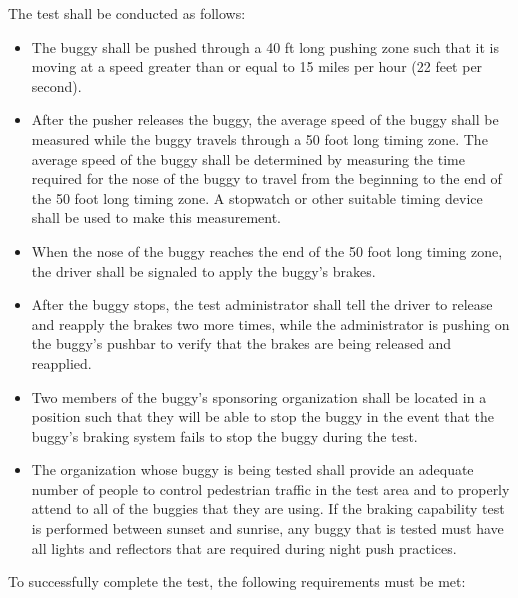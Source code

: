 	The test shall be conducted as follows:

	\begin{itemize}

		\item
		The buggy shall be pushed through a 40 ft long pushing zone such that it is moving at a speed greater than or equal to 15 miles per hour (22 feet per second).


		\item
		After the pusher releases the buggy, the average speed of the buggy shall be measured while the buggy travels through a 50 foot long timing zone. The average speed of the buggy shall be determined by measuring the time required for the nose of the buggy to travel from the beginning to the end of the 50 foot long timing zone. A stopwatch or other suitable timing device shall be used to make this measurement.

		\item
		When the nose of the buggy reaches the end of the 50 foot long timing zone, the driver shall be signaled to apply the buggy's brakes.

		\item
		After the buggy stops, the test administrator shall tell the driver to release and reapply the brakes two more times, while the administrator is pushing on the buggy's pushbar to verify that the brakes are being released and reapplied.

		\item
		Two members of the buggy's sponsoring organization shall be located in a position such that they will be able to stop the buggy in the event that the buggy's braking system fails to stop the buggy during the test.

		\item
		The organization whose buggy is being tested shall provide an adequate number of people to control pedestrian traffic in the test area and to properly attend to all of the buggies that they are using. If the braking capability test is performed between sunset and sunrise, any buggy that is tested must have all lights and reflectors that are required during night push practices.


	\end{itemize}

	To successfully complete the test, the following requirements must be met:

